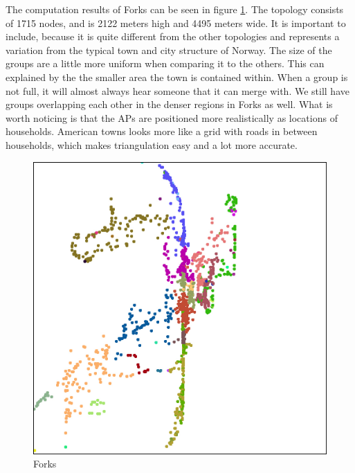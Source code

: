 The computation results of Forks can be seen in figure \ref{fig:forks_topo}. 
The topology consists of 1715 nodes, and is 2122 meters high and 4495 meters wide. It
is important to include, because it is quite different from the other topologies and
represents a variation from the typical town and city structure of Norway.
The size of the groups are a little more uniform when comparing it to the others.
This can explained by the the smaller area the town is contained within. When a group
is not full, it will almost always hear someone that it can merge with.
We still have groups overlapping each other in the denser regions in Forks as well. 
What is worth noticing is that the APs are positioned more realistically as locations
of households. American towns looks more like a grid with roads in between households,
which makes triangulation easy and a lot more accurate. 

\begin{figure}
\center
\includegraphics[scale=0.46]{Images/cities/forks_groups.jpg}
\caption{Forks}
\label{fig:forks_topo}
\end{figure}




